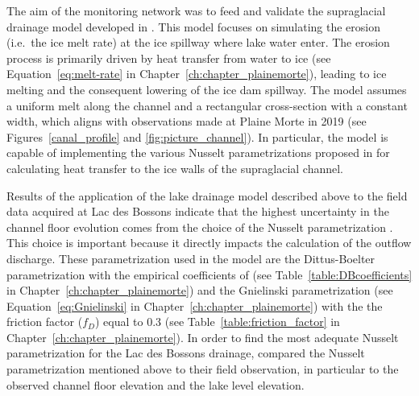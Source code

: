 The aim of the monitoring network was to feed and validate the supraglacial drainage model developed in \cite{Vincent&al2010}. This model focuses on simulating the erosion (i.e.\ the ice melt rate) at the ice spillway where lake water enter. The erosion process is primarily driven by heat transfer from water to ice (see Equation~\ref{eq:melt-rate} in Chapter~\ref{ch:chapter_plainemorte}), leading to ice melting and the consequent lowering of the ice dam spillway. The model assumes a uniform melt along the channel and a rectangular cross-section with a constant width, which aligns with observations made at Plaine Morte in 2019 (see Figures~\ref{canal_profile} and \ref{fig:picture_channel}). In particular, the model is capable of implementing the various Nusselt parametrizations proposed in \citep{Clarke2003, Vincent&al2010, Ogier&al2021} for calculating heat transfer to the ice walls of the supraglacial channel. 



Results of the application of the lake drainage model described above to the field data acquired at Lac des Bossons indicate that the highest uncertainty in the channel floor evolution comes from the choice of the Nusselt parametrization \cite{Gagliardini&al2024}. This choice is important because it directly impacts the calculation of the outflow discharge. These parametrization used in the model are the Dittus-Boelter parametrization with the empirical coefficients of \cite{Clarke2003,Vincent&al2010,Ogier&al2021} (see Table~\ref{table:DBcoefficients} in Chapter~\ref{ch:chapter_plainemorte}) and the Gnielinski parametrization (see Equation~\ref{eq:Gnielinski} in Chapter~\ref{ch:chapter_plainemorte}) with the the friction factor ($f_D$) equal to 0.3 (see Table~\ref{table:friction_factor} in Chapter~\ref{ch:chapter_plainemorte}). In order to find the most adequate Nusselt parametrization for the Lac des Bossons drainage, \cite{Gagliardini&al2024} compared the Nusselt parametrization mentioned above to their field observation, in particular to the observed channel floor elevation and the lake level elevation. 

